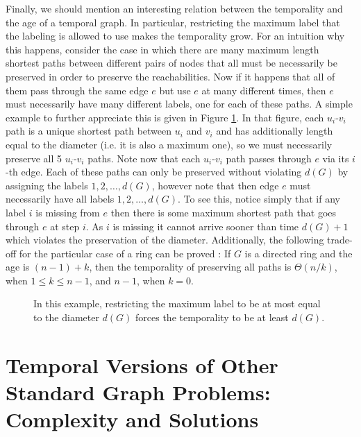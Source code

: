 \documentclass[oribibl, 11pt]{llncs}
\begin{document}
Finally, we should mention an interesting relation between the temporality and the age of a temporal graph. In particular, restricting the maximum label that the labeling is allowed to use makes the temporality grow. For an intuition why this happens, consider the case in which there are many maximum length shortest paths between different pairs of nodes that all must be necessarily be preserved in order to preserve the reachabilities. Now if it happens that all of them pass through the same edge $e$ but use $e$ at many different times, then $e$ must necessarily have many different labels, one for each of these paths. A simple example to further appreciate this is given in Figure \ref{fig:diam}. In that figure, each $u_i$-$v_i$ path is a unique shortest path between $u_i$ and $v_i$ and has additionally length equal to the diameter (i.e. it is also a maximum one), so we must necessarily preserve all 5 $u_i$-$v_i$ paths. Note now that each $u_i$-$v_i$ path passes through $e$ via its $i$-th edge. Each of these paths can only be preserved without violating $d(G)$ by assigning the labels $1,2,\ldots, d(G)$, however note that then edge $e$ must necessarily have all labels $1,2,\ldots,d(G)$. To see this, notice simply that if any label $i$ is missing from $e$ then there is some maximum shortest path that goes through $e$ at step $i$. As $i$ is missing it cannot arrive sooner than time $d(G)+1$ which violates the preservation of the diameter. Additionally, the following trade-off for the particular case of a ring can be proved \cite{MMCS13}: If $G$ is a directed ring and the age is $(n-1)+k$, then the temporality of preserving all paths is $\Theta(n/k)$, when $1\leq k \leq n-1$, and $n-1$, when $k=0$. 

\begin{figure}[!hbtp]
\caption{In this example, restricting the maximum label to be at most equal to the diameter $d(G)$ forces the temporality to be at least $d(G)$.} \label{fig:diam}
\end{figure}

\section{Temporal Versions of Other Standard Graph Problems: Complexity and Solutions}
\label{sec:matching}
\end{document}
